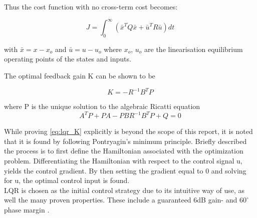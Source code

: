 Thus the cost function with no cross-term cost becomes:

\begin{equation} \label{eq:lqr_cost_fcn}
	J = \int_0^{\infty} \left( \bar{x}^TQ\bar{x} + \bar{u}^TR\bar{u} \right)dt
\end{equation}

with $\bar{x} = x-x_o$ and $\bar{u} = u-u_o$ where $x_o$, $u_o$ are the linearisation equilibrium operating points of the states and inputs.

The optimal feedback gain K can be shown to be

\begin{equation} \label{eq:lqr_K}
	K = -R^{-1}B^{T}P
\end{equation}

where P is the unique solution to the algebraic Ricatti equation
\begin{equation} \label{eq:ricatti}
	A^TP + PA - PBR^{-1}B^TP+Q = 0
\end{equation}

While proving \cref{eq:lqr_K} explicitly is beyond the scope of this report, it is noted that it is found by following Pontryagin's minimum principle. Briefly described the process is to first define the Hamiltonian associated with the optimization problem. Differentiating the Hamiltonian with respect to the control signal u, yields the control gradient. By then setting the gradient equal to 0 and solving for u, the optimal control input is found.\\

LQR is chosen as the initial control strategy due to its intuitive way of use, as well the many proven properties. These include a guaranteed 6dB gain- and $60^\circ$ phase margin \cite{Doyle}.

